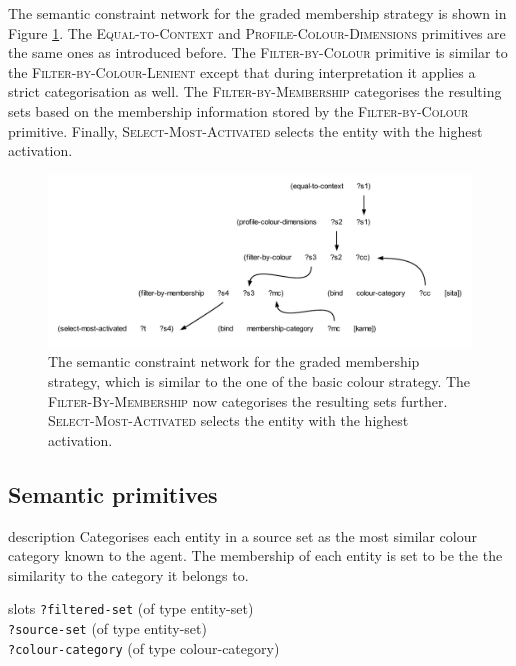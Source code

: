 The semantic constraint network for the graded membership
  strategy is shown in Figure \ref{f:gms-semantic-program}. The
\textsc{Equal-to-Context} and \textsc{Profile-Colour-Dimensions}
primitives are the same ones as introduced before. The
\textsc{Filter-by-Colour} primitive is similar to the
\textsc{Filter-by-Colour-Lenient} except that during interpretation it
applies a strict categorisation as well. The
\textsc{Filter-by-Membership} categorises the resulting sets based on
the membership information stored by the \textsc{Filter-by-Colour}
primitive. Finally, \textsc{Select-Most-Activated} selects the entity
with the highest activation.

\begin{figure}[htbp]
  \centering
  \includegraphics[width=\textwidth]{./graded-membership/figures/semantic-program.pdf}
  \caption[The semantic constraint network for the graded membership
  strategy]{The semantic constraint network for the graded membership
    strategy, which is similar to the one of the basic colour
    strategy. The \textsc{Filter-By-Membership} now categorises the
    resulting sets further. \textsc{Select-Most-Activated} selects the
    entity with the highest activation.}
  \label{f:gms-semantic-program}
\end{figure}

\subsection{Semantic primitives}


\begin{explanation}{description}
  Categorises each entity in a source set as the most similar colour
  category known to the agent. The membership of each entity is set to
  be the the similarity to the category it belongs to.
\end{explanation}

\begin{explanation}{slots}
  \verb+?filtered-set+ (of type entity-set) \\
  \verb+?source-set+ (of type entity-set) \\
  \verb+?colour-category+ (of type colour-category)
\end{explanation}

